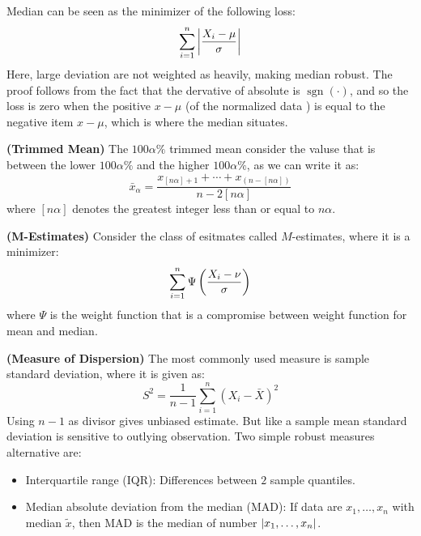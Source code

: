 \begin{remark}
    Median can be seen as the minimizer of the following loss:
    \begin{equation*}
        \sum^n_{i=1}\left| \frac{X_i - \mu}{\sigma} \right|
    \end{equation*}
    Here, large deviation are not weighted as heavily, making median robust. The proof follows from the fact that the dervative of absolute is $\operatorname{sgn}(\cdot)$, and so the loss is zero when the positive $x - \mu$ (of the normalized data ) is equal to the negative item $x - \mu$, which is where the median situates. 
\end{remark}

\begin{definition}{\textbf{(Trimmed Mean)}}
    The $100\alpha\%$ trimmed mean consider the valuse that is between the lower $100\alpha\%$ and the higher $100\alpha\%$, as we can write it as:
    \begin{equation*}
        \bar{x}_\alpha = \frac{x_{[n\alpha] + 1} + \cdots + x_{(n - [n\alpha])}}{n - 2[n\alpha]}
    \end{equation*}
    where $[n\alpha]$ denotes the greatest integer less than or equal to $n\alpha$.
\end{definition}

\begin{definition}{\textbf{(M-Estimates)}}
    Consider the class of esitmates called $M$-estimates, where it is a minimizer:
    \begin{equation*}
        \sum^n_{i=1}\Psi\left( \frac{X_i - \nu}{\sigma} \right)
    \end{equation*}
    where $\Psi$ is the weight function that is a compromise between weight function for mean and median. 
\end{definition}

\begin{remark}{\textbf{(Measure of Dispersion)}}
    The most commonly used measure is sample standard deviation, where it is given as:
    \begin{equation*}
        S^2 = \frac{1}{n-1}\sum^n_{i=1}(X_i - \bar{X})^2
    \end{equation*}
    Using $n-1$ as divisor gives unbiased estimate. But like a sample mean standard deviation is sensitive to outlying observation. Two simple robust measures alternative are:
    \begin{itemize}
        \item Interquartile range (IQR): Differences between $2$ sample quantiles.
        \item Median absolute deviation from the median (MAD): If data are $x_1,\dots,x_n$ with median $\tilde{x}$, then MAD is the median of number $\left| x_1,\dots,x_n \right|$. 
    \end{itemize}
\end{remark}


